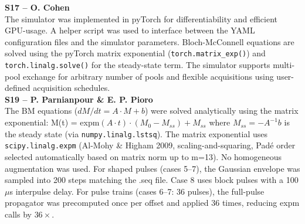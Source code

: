 \documentclass[11pt,a4paper]{article}
\begin{document}
\noindent\textbf{S17 -- O. Cohen}\\
The simulator was implemented in pyTorch for differentiability and efficient GPU-usage. A helper script was used to interface between the YAML configuration files and the simulator parameters. Bloch-McConnell equations are solved using the pyTorch matrix exponential (\verb|torch.matrix_exp()|) and \verb|torch.linalg.solve()| for the steady-state term. The simulator supports multi-pool exchange for arbitrary number of pools and flexible acquisitions using user-defined acquisition schedules.\\




\noindent\textbf{S19 -- P. Parnianpour \& E. P. Pioro}\\
The BM equations ($dM/dt  = A\cdot M + b$) were solved analytically using the matrix exponential:
M(t) = expm$(A\cdot t) \cdot (M_0 - M_{ss}) + M_{ss}$
where $M_{ss} = -A^{-1}b$ is the steady state (via \verb|numpy.linalg.lstsq|). The matrix exponential uses \verb|scipy.linalg.expm| (Al-Mohy \& Higham 2009, scaling-and-squaring, Padé order selected automatically based on matrix norm up to m=13). No homogeneous augmentation was used.
For shaped pulses (cases 5--7), the Gaussian envelope was sampled into 200 steps matching the .seq file. Case 8 uses block pulses with a 100$\mu$s interpulse delay. For pulse trains (cases 6--7: 36 pulses), the full-pulse propagator was precomputed once per offset and applied 36 times, reducing expm calls by $36 \times$.\\



%
\end{document}
